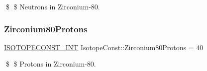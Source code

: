 \$ \$ Neutrons in Zirconium-\/80. \mbox{\label{group___isotope_const-_zirconium-_zr80_ga8c7643118e7909e5654a49f37fa7474e}} 
\subsubsection{\texorpdfstring{Zirconium80\+Protons}{Zirconium80Protons}}
{\footnotesize\ttfamily \mbox{\hyperlink{group___isotope_const-_macros_ga5f18360b3e99483a35c32d789e62621c}{I\+S\+O\+T\+O\+P\+E\+C\+O\+N\+S\+T\+\_\+\+I\+NT}} Isotope\+Const\+::\+Zirconium80\+Protons = 40}

\$ \$ Protons in Zirconium-\/80. 